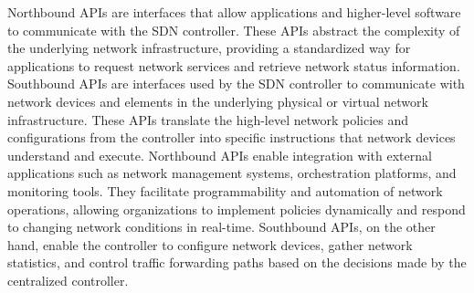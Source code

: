 \documentclass{article}
\begin{document}
	Northbound APIs are interfaces that allow applications and higher-level software to communicate with the SDN controller. These APIs abstract the complexity of the underlying network infrastructure, providing a standardized way for applications to request network services and retrieve network status information. Southbound APIs are interfaces used by the SDN controller to communicate with network devices and elements in the underlying physical or virtual network infrastructure. These APIs translate the high-level network policies and configurations from the controller into specific instructions that network devices understand and execute. Northbound APIs enable integration with external applications such as network management systems, orchestration platforms, and monitoring tools. They facilitate programmability and automation of network operations, allowing organizations to implement policies dynamically and respond to changing network conditions in real-time. Southbound APIs, on the other hand, enable the controller to configure network devices, gather network statistics, and control traffic forwarding paths based on the decisions made by the centralized controller.\\
	
\end{document}
